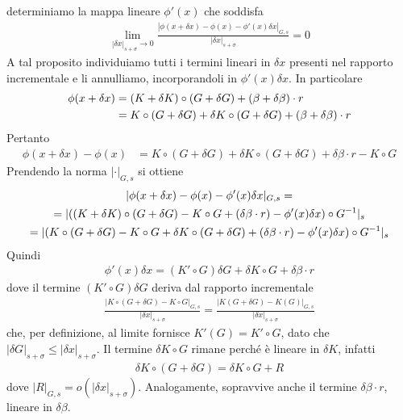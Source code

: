 \documentclass[twoside, 11pt]{amsbook}
\makeatletter
\newcommand{\0}{{(0)}}
\newcommand{\3}{{(3)}}
\theoremstyle{colonplain}
\theoremstyle{colondefinition}
\theoremstyle{colonremark}
\numberwithin{equation}{chapter}
\renewcommand{\proofname}{Dimostrazione}
\renewenvironment{proof}[1][\proofname]{\par
  \pushQED{\qed}%
  \normalfont \topsep6\p@\@plus6\p@\relax
  \trivlist
  \item[\hskip\labelsep\bfseries #1:]\ignorespaces
}{%
  \popQED\endtrivlist\@endpefalse
}
\makeatother
\begin{document}
\begin{proof} determiniamo la mappa lineare $\phi'(x)$ che soddisfa
\begin{align}
    \lim_{|\delta x|_{s + \sigma} \rightarrow 0} \frac{|\phi(x + \delta x) - \phi(x) - \phi'(x)\delta x|_{G, s}}{|\delta x|_{s + \sigma}} = 0
\end{align}
A tal proposito individuiamo tutti i termini lineari in $\delta x$ presenti nel rapporto incrementale e li annulliamo, incorporandoli in $\phi'(x)\delta x$. In particolare
\begin{align}
    \phi(x + \delta x) &= (K + \delta K) \circ (G + \delta G) + (\beta + \delta \beta) \cdot r \notag \\
    &= K \circ (G + \delta G) + \delta K \circ (G + \delta G) + (\beta + \delta \beta) \cdot r
\end{align}
Pertanto
\begin{align}
    \phi(x + \delta x) - \phi(x) &= K \circ (G + \delta G) + \delta K \circ (G + \delta G) + \delta\beta \cdot r - K \circ G
\end{align}
Prendendo la norma $|\cdot|_{G, s}$ si ottiene
\begin{gather}
    |\phi(x + \delta x) - \phi(x) - \phi'(x)\delta x|_{G, s} = \notag \\
    = |((K + \delta K )\circ (G + \delta G) - K \circ G + (\delta\beta \cdot r) - \phi'(x)\delta x) \circ G^{-1}|_{s} \notag \\
    = |(K \circ (G + \delta G) - K \circ G + \delta K \circ (G + \delta G) + (\delta\beta \cdot r) - \phi'(x)\delta x)\circ G^{-1}|_s
\end{gather}
Quindi
\begin{align}
    \phi'(x)\delta x = (K' \circ G)\delta G + \delta K \circ G + \delta\beta \cdot r 
\end{align}
dove il termine $(K' \circ G)\delta G$ deriva dal rapporto incrementale
\begin{align}
    \frac{|K \circ (G + \delta G) - K \circ G|_{G, s}}{|\delta x|_{s + \sigma}} = \frac{|K(G + \delta G) - K(G)|_{G, s}}{|\delta x|_{s + \sigma}}
\end{align}
che, per definizione, al limite fornisce $K'(G) = K' \circ G$, dato che $|\delta G|_{s + \sigma} \leq |\delta x|_{s + \sigma}$. Il termine $\delta K \circ G$ rimane perché è lineare in $\delta K$, infatti
\begin{align}
    \delta K \circ (G + \delta G) = \delta K \circ G + R
\end{align}
dove $|R|_{G, s} = o(|\delta x|_{s + \sigma})$. Analogamente, sopravvive anche il termine $\delta\beta \cdot r$, lineare in $\delta\beta$. \\

\end{proof}
\end{document}
